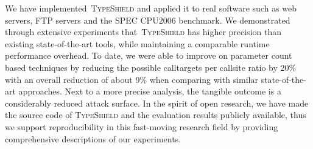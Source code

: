 We have implemented~\textsc{TypeShield} and applied it to real software such as web servers, FTP servers and the SPEC CPU2006 benchmark. 
We demonstrated through extensive experiments that~\textsc{TypeShield} has 
higher precision than existing state-of-the-art tools, while maintaining a comparable runtime performance overhead. 
To date, we were able to improve on parameter count based techniques by reducing the possible calltargets per 
callsite ratio by 20\% with an overall reduction of about 9\% when comparing with similar state-of-the-art approaches. 
Next to a more precise analysis, the tangible outcome is a considerably reduced attack surface.
In the spirit of open research, we have made the source code of \textsc{TypeShield} and the evaluation results publicly available, 
thus we support reproducibility in this fast-moving research field by providing comprehensive descriptions of our experiments.


